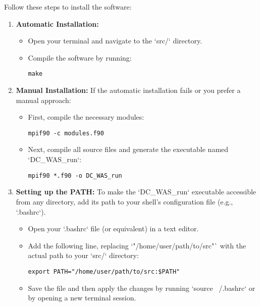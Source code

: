 \documentclass[11pt, oneside]{article}   	%
\begin{document}
Follow these steps to install the software:

\begin{enumerate}
    \item \textbf{Automatic Installation:}
    \begin{itemize}
        \item Open your terminal and navigate to the `src/` directory.
        \item Compile the software by running:
        \begin{verbatim}
make
        \end{verbatim}
    \end{itemize}

    \item \textbf{Manual Installation:}
    If the automatic installation fails or you prefer a manual approach:
    \begin{itemize}
        \item First, compile the necessary modules:
        \begin{verbatim}
mpif90 -c modules.f90
        \end{verbatim}
        \item Next, compile all source files and generate the executable named `DC\_WAS\_run`:
        \begin{verbatim}
mpif90 *.f90 -o DC_WAS_run
        \end{verbatim}
    \end{itemize}

    \item \textbf{Setting up the PATH:}
    To make the `DC\_WAS\_run` executable accessible from any directory, add its path to your shell's configuration file (e.g., `.bashrc`).
    \begin{itemize}
        \item Open your `.bashrc` file (or equivalent) in a text editor.
        \item Add the following line, replacing `"/home/user/path/to/src"` with the actual path to your `src/` directory:
        \begin{verbatim}
export PATH="/home/user/path/to/src:$PATH"
        \end{verbatim}
        \item Save the file and then apply the changes by running `source ~/.bashrc` or by opening a new terminal session.
    \end{itemize}
\end{enumerate}
\end{document}
